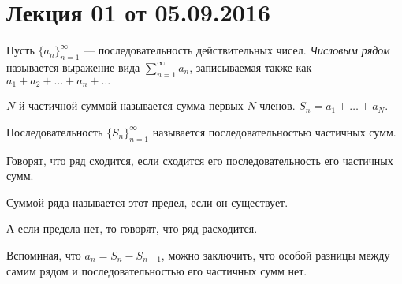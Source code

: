 \documentclass[a4paper, 12pt]{article}
\begin{document}
\pagestyle{fancy}
\section{Лекция 01 от 05.09.2016}
\begin{Def}
	Пусть \(\{a_n\}^{\infty}_{n=1}\) --- последовательность действительных чисел. \emph{Числовым рядом} называется выражение вида \(\sum\limits_{n=1}^{\infty}a_n\), записываемая также как \(a_1 + a_2 + \ldots + a_n + \ldots \)
	
\end{Def}
\begin{Def}
	\(N\)-й частичной суммой называется сумма первых \(N\) членов. \(S_n = a_1 + \ldots + a_N\).
\end{Def}

\begin{Def}
	Последовательность \(\{S_n\}^{\infty}_{n=1}\)
	называется последовательностью частичных сумм.
\end{Def}
\begin{Def}
	Говорят, что ряд сходится, если сходится его последовательность его частичных сумм.
\end{Def}
\begin{Def}
	Суммой ряда называется этот предел, если он существует.
\end{Def}
\begin{Def}
	А если предела нет, то говорят, что ряд расходится.
\end{Def}
Вспоминая, что $a_n = S_{n} - S_{n-1}$, можно заключить, что особой разницы между самим рядом и последовательностью его частичных сумм нет.
\end{document}
